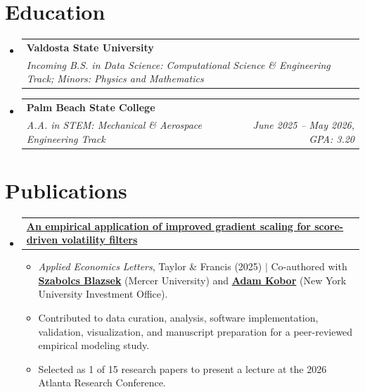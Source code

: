 \documentclass[letterpaper,11pt]{article}
\makeatletter
\newcommand{\resumeItem}[1]{
  \item\small{
    {#1 \vspace{-1pt}}
  }
}
\newcommand{\resumeProjectHeading}[2]{
    \item
    \begin{tabular*}{0.97\textwidth}{l@{\extracolsep{\fill}}r}
      \small#1 & #2 \\
    \end{tabular*}\vspace{-6pt}
}
\newcommand{\resumeEducationEntry}[3]{
  \vspace{-2pt}\item
    \begin{tabular*}{0.97\textwidth}[t]{l@{\extracolsep{\fill}}r}
      \textbf{#1} & \\
      \textit{\small#2} & \textit{\small #3} \hfill
    \end{tabular*}\vspace{-4pt}
}
\newcommand{\resumeSubHeadingListStart}{\begin{itemize}[leftmargin=0.15in, label={}]}
\newcommand{\resumeSubHeadingListEnd}{\end{itemize}}
\newcommand{\resumeItemListStart}{\begin{itemize}}
\newcommand{\resumeItemListEnd}{\end{itemize}\vspace{-5pt}}
\makeatother
\begin{document}
\section{Education}
  \resumeSubHeadingListStart
    \resumeEducationEntry
      {Valdosta State University}
      {Incoming B.S. in Data Science: Computational Science \& Engineering Track; Minors: Physics and Mathematics}
      {}

    \resumeEducationEntry
      {Palm Beach State College}
      {A.A. in STEM: Mechanical \& Aerospace Engineering Track}
      {June 2025 -- May 2026, GPA: 3.20}
  \resumeSubHeadingListEnd
  
\section{Publications}
  \resumeSubHeadingListStart
    \resumeProjectHeading
      {\href{https://www.tandfonline.com/doi/full/10.1080/13504851.2025.2606928}{\textbf{An empirical application of improved gradient scaling for score-driven volatility filters}}}{}
    \resumeItemListStart
      \resumeItem{\textit{Applied Economics Letters}, Taylor \& Francis (2025) $|$ Co-authored with \href{https://business.mercer.edu/faculty-and-insights/faculty-directory/dr-szabolcs-blazsek/}{\textbf{Szabolcs Blazsek}} (Mercer University) and \href{https://www.linkedin.com/in/adamkobor/}{\textbf{Adam Kobor}} (New York University Investment Office).}
      \resumeItem{Contributed to data curation, analysis, software implementation, validation, visualization, and manuscript preparation for a peer-reviewed empirical modeling study.}      \resumeItem{Selected as 1 of 15 research papers to present a lecture at the 2026 Atlanta Research Conference.}
      \resumeItemListEnd
  \resumeSubHeadingListEnd


\end{document}
